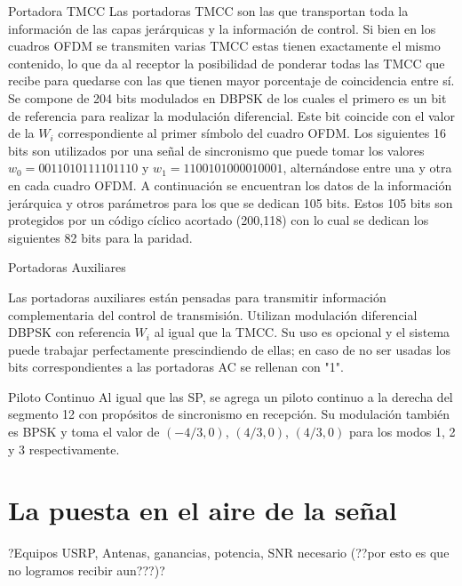 
Portadora TMCC
Las portadoras TMCC son las que transportan toda la información de las capas jerárquicas y la información de control. Si bien en los cuadros OFDM se transmiten varias TMCC estas tienen exactamente el mismo contenido, lo que da al receptor la posibilidad de ponderar todas las TMCC que recibe para quedarse con las que tienen mayor porcentaje de coincidencia entre sí.
Se compone de 204 bits modulados en DBPSK de los cuales el primero es un bit de referencia para realizar la modulación diferencial. Este bit coincide con el valor de la $W_i$ correspondiente al primer símbolo del cuadro OFDM.
Los siguientes 16 bits son utilizados por una señal de sincronismo que puede tomar los valores $w_0 = 0011010111101110$ y $w_1 = 1100101000010001$, alternándose entre una y otra en cada cuadro OFDM.
A continuación se encuentran los datos de la información jerárquica y otros parámetros para los que se dedican 105 bits. Estos 105 bits son protegidos por un código cíclico acortado (200,118) con lo cual se dedican los siguientes 82 bits para la paridad. 
  
Portadoras Auxiliares

Las portadoras auxiliares están pensadas para transmitir información complementaria del control de transmisión. Utilizan modulación diferencial DBPSK con referencia $W_i$ al igual que la TMCC. Su uso es opcional y el sistema puede trabajar perfectamente prescindiendo de ellas; en caso de no ser usadas los bits correspondientes a las portadoras AC se rellenan con "1".

Piloto Continuo
Al igual que las SP, se agrega un piloto continuo a la derecha del segmento 12 con propósitos de sincronismo en recepción. Su modulación también es BPSK y toma el valor de $(-4/3, 0)$, $(4/3, 0)$, $(4/3, 0)$ para los modos 1, 2 y 3 respectivamente.








\section{La puesta en el aire de la señal}

?Equipos USRP, Antenas, ganancias, potencia, SNR necesario (??por esto es que no logramos recibir aun???)?

